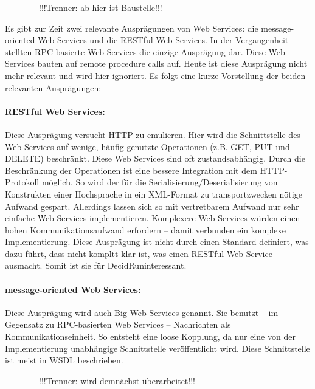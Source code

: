 \documentclass[runningheads]{llncs}
\newcommand{\germanquote}[1]{\glqq{}#1\grqq{}}
\newcommand{\decidr}{DecidR}
\begin{document}
   \begin{center}--- --- --- !!!Trenner: ab hier ist Baustelle!!! --- --- ---\end{center}

    Es gibt zur Zeit zwei relevante Ausprägungen von Web Services: die \germanquote{message-oriented Web Services} und die \germanquote{RESTful Web Services}. In der Vergangenheit stellten RPC-basierte Web Services die einzige Ausprägung dar. Diese Web Services bauten auf \germanquote{remote procedure calls} auf. Heute ist diese Ausprägung nicht mehr relevant und wird hier ignoriert. Es folgt eine kurze Vorstellung der beiden relevanten Ausprägungen:

    \paragraph{RESTful Web Services:}
      Diese Ausprägung versucht HTTP zu emulieren. Hier wird die Schnittstelle des Web Services auf wenige, häufig genutzte Operationen (z.B. GET, PUT und DELETE) beschränkt. Diese Web Services sind oft zustandsabhängig. Durch die Beschränkung der Operationen ist eine bessere Integration mit dem HTTP-Protokoll möglich. So wird der für die Serialisierung/Deserialisierung von Konstrukten einer Hochsprache in ein XML-Format zu transportzwecken nötige Aufwand gespart. Allerdings lassen sich so mit vertretbarem Aufwand nur sehr einfache Web Services implementieren. Komplexere Web Services würden einen hohen Kommunikationsaufwand erfordern -- damit verbunden ein komplexe Implementierung. Diese Ausprägung ist nicht durch einen Standard definiert, was dazu führt, dass nicht kompltt klar ist, was einen RESTful Web Service ausmacht. Somit ist sie für \decidr uninteressant.

    \paragraph{message-oriented Web Services:}
      Diese Ausprägung wird auch \germanquote{Big Web Services} genannt. Sie benutzt -- im Gegensatz zu RPC-basierten Web Services -- Nachrichten als Kommunikationseinheit. So entsteht eine loose Kopplung, da nur eine von der Implementierung unabhängige Schnittstelle veröffentlicht wird. Diese Schnittstelle ist meist in WSDL beschrieben.

   \begin{center}--- --- --- !!!Trenner: wird demnächst überarbeitet!!! --- --- ---\end{center}
\end{document}
